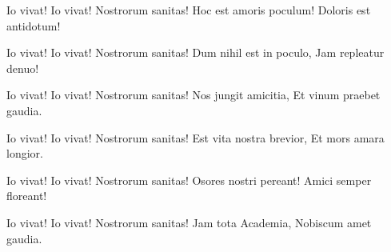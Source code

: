 
\beginverse
Io vivat! Io vivat!
Nostrorum sanitas!
Hoc est amoris poculum!
Doloris est antidotum!
\endverse

\beginverse
Io vivat! Io vivat!
Nostrorum sanitas!
Dum nihil est in poculo,
Jam repleatur denuo!
\endverse

\beginverse
Io vivat! Io vivat!
Nostrorum sanitas!
Nos jungit amicitia,
Et vinum praebet gaudia.
\endverse

\beginverse
Io vivat! Io vivat!
Nostrorum sanitas!
Est vita nostra brevior,
Et mors amara longior.
\endverse

\beginverse
Io vivat! Io vivat!
Nostrorum sanitas!
Osores nostri pereant!
Amici semper floreant!
\endverse

\beginverse
Io vivat! Io vivat!
Nostrorum sanitas!
Jam tota Academia,
Nobiscum amet gaudia.
\endverse

\endsong